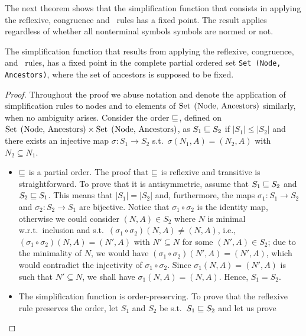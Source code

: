 The next theorem shows that the simplification function that consists
in applying the reflexive, congruence and \BPA\ rules has a fixed
point.  The result applies regardless of whether all nonterminal
symbols symbols are normed or not.

\begin{theorem}
  \label{thm:fixed_point}
  The simplification function that results from applying the
  reflexive, congruence, and \BPA\ rules, has a fixed point in the
  complete partial ordered set
  {\upshape\lstinline|Set (Node, Ancestors)|}, where the set of
  ancestors is supposed to be fixed. %
\end{theorem}

\begin{proof}
  Throughout the proof we abuse notation and denote the application
  of simplification rules to nodes and to elements of
  $\text{\lstinline{Set (Node, Ancestors)}}$ similarly, when no
  ambiguity arises.
%
  Consider the order $\sqsubseteq$, defined on
  $\text{\lstinline{Set (Node, Ancestors)}} \times
  \text{\lstinline{Set (Node, Ancestors)}}$, as $S_1 \sqsubseteq S_2$ if
  $|S_1| \leq |S_2|$ and there exists an injective map
  $\sigma : S_1 \rightarrow S_2$ s.t.\ $\sigma(N_1,A) = (N_2,A)$ with
  $N_2\subseteq N_1$.
  \begin{itemize}
  \item $\sqsubseteq$ is a partial order. The proof that $\sqsubseteq$ is
    reflexive and transitive is straightforward.  To prove that it is
    antisymmetric, assume that $S_1\sqsubseteq S_2$ and
    $S_2 \sqsubseteq S_1$.  This means that $|S_1|=|S_2|$ and,
    furthermore, the maps $\sigma_1 : S_1 \rightarrow S_2$ and
    $\sigma_2 : S_2 \rightarrow S_1$ are bijective. Notice that
    $\sigma_1\circ \sigma_2$ is the identity map, otherwise we could
    consider $(N,A)\in S_2$ where $N$ is minimal w.r.t.\ inclusion and
    s.t.\ $(\sigma_1\circ \sigma_2)(N,A) \neq (N,A)$, i.e.,
    $(\sigma_1\circ \sigma_2)(N,A) = (N',A)$ with $N'\subseteq N$ for
    some $(N',A)\in S_2$; due to the minimality of $N$, we would have
    $(\sigma_1\circ \sigma_2)(N',A) = (N',A)$, which would contradict
    the injectivity of $\sigma_1\circ \sigma_2$. Since
    $\sigma_1 (N,A) = (N',A)$ is such that $N'\subseteq N$, we shall
    have $\sigma_1 (N,A) = (N,A)$. Hence, $S_1=S_2$.
  \item The simplification function is order-preserving.
	To prove that the reflexive rule preserves the order, let
        $S_1$ and $S_2$ be s.t.\ $S_1\sqsubseteq S_2$ and let us prove

\end{itemize}
\end{proof}

